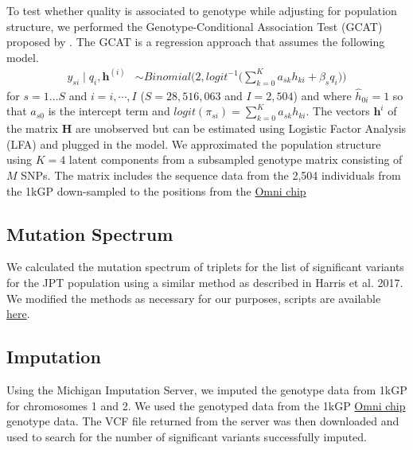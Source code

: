 \documentclass[9pt,lineno]{elife}
\begin{document}
To test whether quality is associated to genotype while adjusting for population structure, we performed the Genotype-Conditional Association Test  (GCAT) proposed by \citep{song2015testing}.
The GCAT is a regression approach that assumes the following model.
\begin{align}\label{gcat}
 y_{si} \mid q_i, \boldsymbol{h}^{(i)} &\sim Binomial\bigg( 2, logit^{-1}\Big( \sum_{k=0}^{K} a_{sk} h_{ki} + \beta_s q_i\Big) \bigg)
\end{align} 
for $s=1\hdots S$ and $i=i,\cdots, I$  ($S = 28,516,063$ and $I = 2,504$) and where $\hat{h}_{0i}=1$ so that $a_{s0}$ is the intercept term and $logit(\pi_{si})=\sum_{k=0}^{K} a_{sk} h_{ki}$. 
The vectors $\boldsymbol{h}^{i}$ of the matrix $\mathbf{H}$ are unobserved but can be estimated using Logistic Factor Analysis (LFA) \citep{song2015testing} and plugged in the model. 
We approximated the population structure using $K=4$ latent components from a subsampled genotype matrix consisting of $M$ SNPs. 
The matrix includes the sequence data from the 2,504 individuals from the 1kGP down-sampled to the positions from the \href{ftp://ftp.1000genomes.ebi.ac.uk/vol1/ftp/release/20130502/supporting/hd_genotype_chip/ALL.chip.omni_broad_sanger_combined.20140818.snps.genotypes.vcf.gz}{Omni chip}

\subsection{Mutation Spectrum}
We calculated the mutation spectrum of triplets for the list of significant variants for the JPT population using a similar method as described in Harris et al. 2017. \citep{Harris2017a}
We modified the methods as necessary for our purposes, scripts are available \href{https://github.com/LukeAndersonTrocme/QualityPaper}{here}. 

\subsection{Imputation}
Using the Michigan Imputation Server, we imputed the genotype data from 1kGP for chromosomes 1 and 2.
We used the genotyped data from the 1kGP \href{ftp://ftp.1000genomes.ebi.ac.uk/vol1/ftp/release/20130502/supporting/hd_genotype_chip/ALL.chip.omni_broad_sanger_combined.20140818.snps.genotypes.vcf.gz}{Omni chip} genotype data.
The VCF file returned from the server was then downloaded and used to search for the number of significant variants successfully imputed. 
\end{document}
